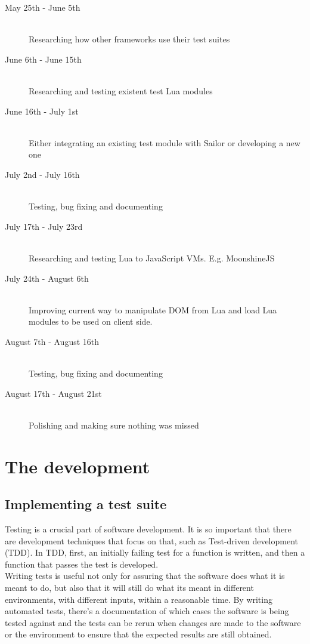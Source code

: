 \documentclass{article}
\begin{document}
		\begin{description}
	  \item[May 25th - June 5th] \hfill \\
	  Researching how other frameworks use their test suites
	  \item[June 6th - June 15th] \hfill \\
	  Researching and testing existent test Lua modules
	  \item[June 16th - July 1st] \hfill \\
	  Either integrating an existing test module with Sailor or developing a new one
	  \item[July 2nd - July 16th] \hfill \\
	  Testing, bug fixing and documenting
			\item[July 17th - July 23rd] \hfill \\
	  Researching and testing Lua to JavaScript VMs. E.g. MoonshineJS
			\item[July 24th - August 6th] \hfill \\
	  Improving current way to manipulate DOM from Lua and load Lua modules to be used on client side.
			\item[August 7th - August 16th] \hfill \\
	  Testing, bug fixing and documenting
			\item[August 17th - August 21st] \hfill \\
	  Polishing and making sure nothing was missed
		\end{description}
		
\newpage
\section{The development}

\subsection{Implementing a test suite}

Testing is a crucial part of software development. It is so important that there are development techniques that focus on that, such as Test-driven development (TDD). In TDD, first, an initially failing test for a function is written, and then a function that passes the test is developed. \\

Writing tests is useful not only for assuring that the software does what it is meant to do, but also that it will still do what its meant in different environments, with different inputs, within a reasonable time. By writing automated tests, there's a documentation of which cases the software is being tested against and the tests can be rerun when changes are made to the software or the environment to ensure that the expected results are still obtained.\\
\end{document}
